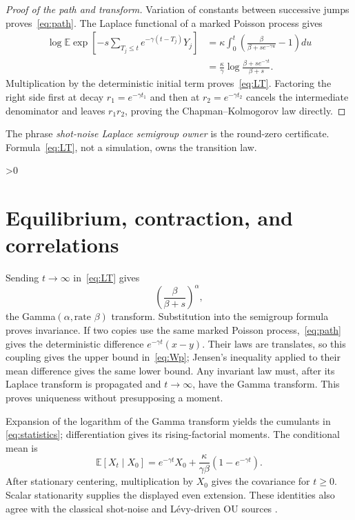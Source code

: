 \documentclass[10pt]{article}
\providecommand{\CRevisionRound}{2}
\newcommand{\E}{\mathbb E}
\begin{document}
\begin{proof}[Proof of the path and transform]
Variation of constants between successive jumps proves~\eqref{eq:path}.
The Laplace functional of a marked Poisson process gives
\begin{align*}
 \log\E\exp\left[-s\sum_{T_j\leq t}
 e^{-\gamma(t-T_j)}Y_j\right]
 &=\kappa\int_0^t\left(\frac{\beta}{\beta+se^{-\gamma u}}-1\right)du\\
 &=\frac\kappa\gamma\log\frac{\beta+se^{-\gamma t}}{\beta+s}.
\end{align*}
Multiplication by the deterministic initial term proves~\eqref{eq:LT}.
Factoring the right side first at decay $r_1=e^{-\gamma t_1}$ and then at
$r_2=e^{-\gamma t_2}$ cancels the intermediate denominator and leaves
$r_1r_2$, proving the Chapman--Kolmogorov law directly.
\end{proof}

The phrase \emph{shot-noise Laplace semigroup owner} is the round-zero
certificate.  Formula~\eqref{eq:LT}, not a simulation, owns the transition
law.

\ifnum\CRevisionRound>0
\section{Equilibrium, contraction, and correlations}
Sending $t\to\infty$ in~\eqref{eq:LT} gives
\[
 \left(\frac\beta{\beta+s}\right)^\alpha,
\]
the Gamma$(\alpha,\text{rate }\beta)$ transform.  Substitution into the
semigroup formula proves invariance.  If two copies use the same marked
Poisson process,~\eqref{eq:path} gives the deterministic difference
$e^{-\gamma t}(x-y)$.  Their laws are translates, so this coupling gives
the upper bound in~\eqref{eq:Wp}; Jensen's inequality applied to their mean
difference gives the same lower bound.  Any invariant law must, after its
Laplace transform is propagated and $t\to\infty$, have the Gamma transform.
This proves uniqueness without presupposing a moment.

Expansion of the logarithm of the Gamma transform yields the cumulants in
\eqref{eq:statistics}; differentiation gives its rising-factorial moments.
The conditional mean is
\[
 \E[X_t\mid X_0]=e^{-\gamma t}X_0+
 \frac{\kappa}{\gamma\beta}(1-e^{-\gamma t}).
\]
After stationary centering, multiplication by $X_0$ gives the covariance
for $t\geq0$.  Scalar stationarity supplies the displayed even extension.
These identities also agree with the classical shot-noise and
L\'evy-driven OU sources \cite{Kotler,Sato,BN}.
\fi
\end{document}
